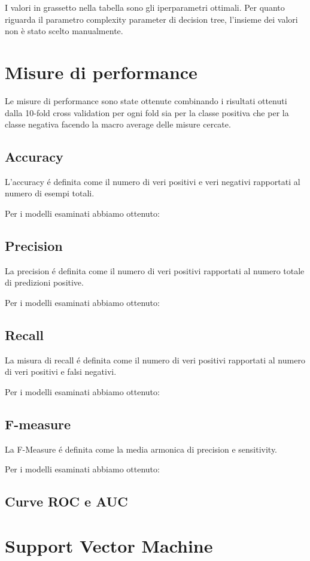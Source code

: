 I valori in grassetto nella tabella sono gli iperparametri ottimali.
Per quanto riguarda il parametro complexity parameter di decision tree, l'insieme dei valori non è stato scelto manualmente.


\section{Misure di performance}
Le misure di performance sono state ottenute combinando i risultati
ottenuti dalla 10-fold cross validation per ogni fold sia per la
classe positiva che per la classe negativa facendo la macro average
delle misure cercate.

\subsection{Accuracy}
L'accuracy é definita come il numero di veri positivi e veri negativi
rapportati al numero di esempi totali.

Per i modelli esaminati abbiamo ottenuto:

\subsection{Precision}
La precision é definita come il numero di veri positivi rapportati al
numero totale di predizioni positive.

Per i modelli esaminati abbiamo ottenuto:
\subsection{Recall}
La misura di recall é definita come il numero di veri positivi
rapportati al numero di veri positivi e falsi negativi.

Per i modelli esaminati abbiamo ottenuto:
\subsection{F-measure}
La F-Measure é definita come la media armonica di precision e
sensitivity.

Per i modelli esaminati abbiamo ottenuto:
\subsection{Curve ROC e AUC}

\section{Support Vector Machine}
